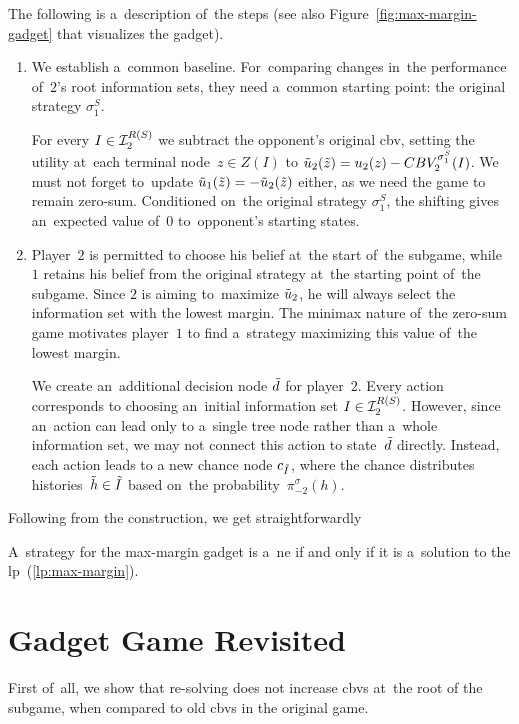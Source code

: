 The following is a~description of~the steps (see also Figure~\ref{fig:max-margin-gadget} that visualizes the gadget).
\begin{enumerate}
  \item We establish a~common baseline.
    For~comparing changes in~the performance of~$2$'s root information sets, they need a~common starting point:
    the original strategy $\sigma_1^S$.

    For every $I \in \mathcal{I}_2^{R(S)}$ we subtract the opponent's original \acrlong{cbv}, setting the utility at~each terminal node~$z \in Z(I)$ to $\tilde{u}_2(\tilde{z}) = u_2(z) - CBV_2^{\sigma^S_1}(I)$.
    We must not forget to~update $\tilde{u}_1(\tilde{z}) = -\tilde{u}_2(\tilde{z})$ either, as we need the game to remain zero-sum.
    Conditioned on~the original strategy $\sigma_1^S$, the shifting gives an~expected value of~$0$ to~opponent's starting states.

  \item Player~$2$ is permitted to choose his belief at~the start of~the subgame, while $1$ retains his belief from the original strategy at~the starting point of~the subgame.
    Since $2$ is aiming to~maximize $\tilde{u}_2$, he will always select the information set with the lowest margin.
    The minimax nature of~the zero-sum game motivates player~$1$ to find a~strategy maximizing this value of~the lowest margin.

    We create an~additional decision node $\tilde{d}$ for player~$2$.
    Every action corresponds to choosing an~initial information set $I\in \mathcal{I}_2^{R(S)}$.
    However, since an~action can lead only to a~single tree node rather than a~whole information set, we may not connect this action to state~$\tilde{d}$ directly.
    Instead, each action leads to a new chance node $c_{\tilde{I}}$, where the chance distributes histories~$\tilde{h} \in \tilde{I}$ based on~the probability~$\pi_{-2}^\sigma (h)$.

    \todo
\end{enumerate}

Following from the construction, we get straightforwardly
\begin{claim}
  A~strategy for the max-margin gadget is a~\acrlong{ne} if and only if it is a~solution to the \acrshort{lp}~(\ref{lp:max-margin}).
\end{claim}

\section{Gadget Game Revisited}
First of~all, we show that re-solving does not increase \acrshort{cbv}s at~the root of the subgame, when compared to old \acrshort{cbv}s in the original game.

